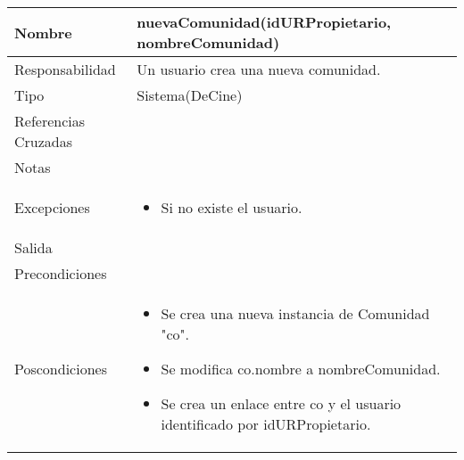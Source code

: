 \documentclass{article}
\begin{document}
\begin{table}[h]
\begin{tabular}{|l|l|l|l|l|l|}
\hline
\multicolumn{2}{|p{3cm}|}{Nombre} & \multicolumn{3}{p{10cm}|}{\textbf{nuevaComunidad(idURPropietario, nombreComunidad)}}\\
\hline
\multicolumn{2}{|p{3cm}|}{Responsabilidad} & \multicolumn{4}{p{10cm}|}{Un usuario crea una nueva comunidad.} \\
\hline
\multicolumn{2}{|p{3cm}|}{Tipo} & \multicolumn{4}{p{10cm}|}{Sistema(DeCine)} \\
\hline
\multicolumn{2}{|p{3cm}|}{Referencias Cruzadas} & \multicolumn{4}{p{10cm}|}{} \\
\hline
\multicolumn{2}{|p{3cm}|}{Notas} & \multicolumn{4}{p{10cm}|}{} \\
\hline
\multicolumn{2}{|p{3cm}|}{Excepciones} & \multicolumn{4}{p{10cm}|}{\begin{itemize}
\item Si no existe el usuario.
\end{itemize}} \\
\hline
\multicolumn{2}{|p{3cm}|}{Salida} & \multicolumn{4}{p{10cm}|}{} \\
\hline
\multicolumn{2}{|p{3cm}|}{Precondiciones} & \multicolumn{4}{p{10cm}|}{} \\
\hline
\multicolumn{2}{|p{3cm}|}{Poscondiciones} & \multicolumn{4}{p{10cm}|}{\begin{itemize}
\item Se crea una nueva instancia de Comunidad "co".
\item Se modifica co.nombre a nombreComunidad.
\item Se crea un enlace entre co y el usuario identificado por idURPropietario.
\end{itemize}}\\
\hline
\end{tabular}
\end{table}
\end{document}
